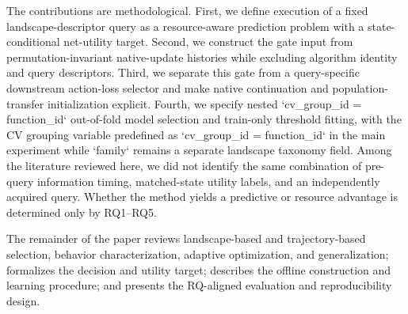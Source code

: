 The contributions are methodological. First, we define execution of a fixed landscape-descriptor query as a resource-aware prediction problem with a state-conditional net-utility target. Second, we construct the gate input from permutation-invariant native-update histories while excluding algorithm identity and query descriptors. Third, we separate this gate from a query-specific downstream action-loss selector and make native continuation and population-transfer initialization explicit. Fourth, we specify nested `cv_group_id = function_id` out-of-fold model selection and train-only threshold fitting, with the CV grouping variable predefined as `cv_group_id = function_id` in the main experiment while `family` remains a separate landscape taxonomy field. Among the literature reviewed here, we did not identify the same combination of pre-query information timing, matched-state utility labels, and an independently acquired query. Whether the method yields a predictive or resource advantage is determined only by RQ1--RQ5.

The remainder of the paper reviews landscape-based and trajectory-based selection, behavior characterization, adaptive optimization, and generalization; formalizes the decision and utility target; describes the offline construction and learning procedure; and presents the RQ-aligned evaluation and reproducibility design.
